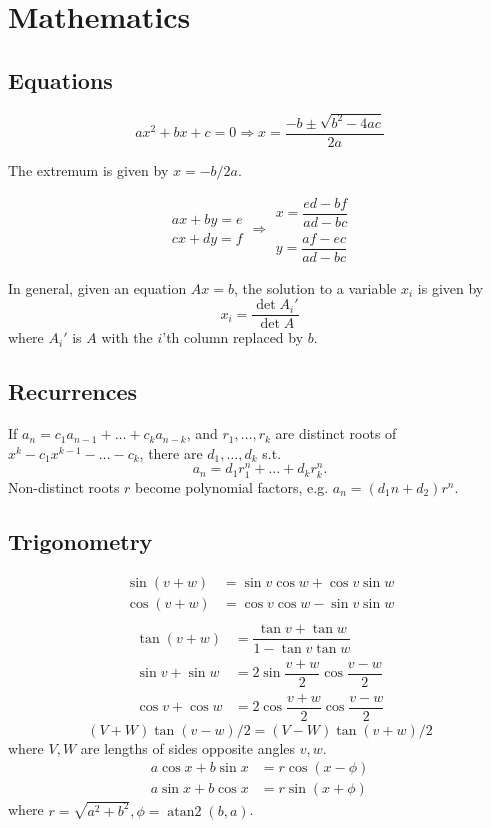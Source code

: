 \chapter{ Mathematics }

\section{Equations}
\[ax^2+bx+c=0 \Rightarrow x = \frac{-b\pm\sqrt{b^2-4ac}}{2a}\]

The extremum is given by $x = -b/2a$.

\[\begin{aligned}ax+by=e\\cx+dy=f\end{aligned}
     \Rightarrow
     \begin{aligned}x=\dfrac{ed-bf}{ad-bc}\\y=\dfrac{af-ec}{ad-bc}\end{aligned}\]

In general, given an equation $Ax = b$, the solution to a variable $x_i$ is
given by
\[x_i = \frac{\det A_i'}{\det A} \]
where $A_i'$ is $A$ with the $i$'th column replaced by $b$.

\section{Recurrences}
If $a_n = c_1 a_{n-1} + \dots + c_k a_{n-k}$, and $r_1, \dots, r_k$ are
distinct roots of $x^k - c_1 x^{k-1} - \dots - c_k$, there are $d_1, \dots,
     d_k$ s.t.
\[a_n = d_1r_1^n + \dots + d_kr_k^n. \]
Non-distinct roots $r$ become polynomial factors, e.g. $a_n = (d_1n + d_2)r^n$.

\section{Trigonometry}
\begin{align*}
     \sin(v+w) & {}=\sin v\cos w+\cos v\sin w \\
     \cos(v+w) & {}=\cos v\cos w-\sin v\sin w \\
\end{align*}
\begin{align*}
     \tan(v+w)     & {}=\dfrac{\tan v+\tan w}{1-\tan v\tan w} \\
     \sin v+\sin w & {}=2\sin\dfrac{v+w}{2}\cos\dfrac{v-w}{2} \\
     \cos v+\cos w & {}=2\cos\dfrac{v+w}{2}\cos\dfrac{v-w}{2}
\end{align*}
\[ (V+W)\tan(v-w)/2{}=(V-W)\tan(v+w)/2 \]
where $V, W$ are lengths of sides opposite angles $v, w$.
\begin{align*}
     a\cos x+b\sin x & =r\cos(x-\phi) \\
     a\sin x+b\cos x & =r\sin(x+\phi)
\end{align*}
where $r=\sqrt{a^2+b^2}, \phi=\operatorname{atan2}(b,a)$.

